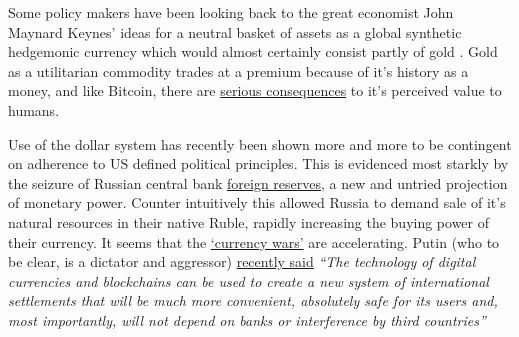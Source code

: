 Some policy makers have been looking back to the great economist John Maynard Keynes' ideas for a neutral basket of assets as a global synthetic hedgemonic currency \cite{carney2019growing, piffaretti2009reshaping} which would almost certainly consist partly of gold \cite{stoeferle2018gold}. Gold as a utilitarian commodity trades at a premium because of it's history as a money, and like Bitcoin, there are \href{https://www.newyorker.com/magazine/2023/02/27/the-dystopian-underworld-of-south-africas-illegal-gold-mines}{serious consequences} to it's perceived value to humans. \par
Use of the dollar system has recently been shown more and more to be contingent on adherence to US defined political principles. This is evidenced most starkly by the seizure of Russian central bank \href{https://twitter.com/RussianEmbassy/status/1504530573527760909}{foreign reserves}, a new and untried projection of monetary power. Counter intuitively this allowed Russia to demand sale of it's natural resources in their native Ruble, rapidly increasing the buying power of their currency. It seems that the \href{https://mronline.org/2022/04/16/russias-sergey-glazyev-introduces-the-new-global-financial-system/}{`currency wars'} are accelerating. Putin (who to be clear, is a dictator and aggressor) \href{https://finance.yahoo.com/news/russia-calls-payment-system-based-135512758.html}{recently said} \textit{``The technology of digital currencies and blockchains can be used to create a new system of international settlements that will be much more convenient, absolutely safe for its users and, most importantly, will not depend on banks or interference by third countries'' }\par  
